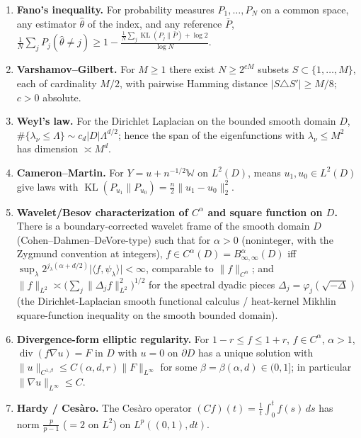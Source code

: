 \documentclass[11pt]{article}
\theoremstyle{remark}
\newcommand{\W}{\mathbb{W}}
\newcommand{\norm}[1]{\lVert #1\rVert}
\newcommand{\abs}[1]{\lvert #1\rvert}
\newcommand{\inner}[2]{\langle #1,#2\rangle}
\newcommand{\SET}[1]{\{#1\}}
\DeclareMathOperator{\diver}{div}
\begin{document}
\begin{enumerate}[label=(T\arabic*),itemsep=1pt,leftmargin=2.2em]
\item\label{T:fano}\textbf{Fano's inequality.} For probability measures
$P_1,\dots,P_N$ on a common space, any estimator $\widehat\theta$ of the
index, and any reference $\bar P$,
$\frac1N\sum_{j} P_j(\widehat\theta\ne j)\ge 1-\frac{\frac1N\sum_j
\operatorname{KL}(P_j\|\bar P)+\log 2}{\log N}$.
\item\label{T:VG}\textbf{Varshamov--Gilbert.} For $M\ge1$ there exist
$N\ge 2^{cM}$ subsets $S\subset\SET{1,\dots,M}$, each of cardinality $M/2$,
with pairwise Hamming distance $\abs{S\triangle S'}\ge M/8$; $c>0$
absolute.
\item\label{T:weyl}\textbf{Weyl's law.} For the Dirichlet Laplacian on the
bounded smooth domain $D$, $\#\SET{\lambda_\nu\le\Lambda}\sim
c_d\abs D\Lambda^{d/2}$; hence the span of the eigenfunctions with
$\lambda_\nu\le M^2$ has dimension $\asymp M^{d}$.
\item\label{T:CM}\textbf{Cameron--Martin.} For $Y=u+n^{-1/2}\W$ on
$L^2(D)$, means $u_1,u_0\in L^2(D)$ give laws with
$\operatorname{KL}(P_{u_1}\|P_{u_0})=\frac{n}{2}\norm{u_1-u_0}_2^2$.
\item\label{T:wave}\textbf{Wavelet/Besov characterization of $C^\alpha$
and square function on $D$.} There is a boundary-corrected wavelet frame of
the smooth domain $D$ (Cohen--Dahmen--DeVore-type) such that for
$\alpha>0$ (noninteger, with the Zygmund convention at integers),
$f\in C^\alpha(D)=B^\alpha_{\infty,\infty}(D)$ iff
$\sup_{\lambda}2^{j_\lambda(\alpha+d/2)}\abs{\inner{f}{\psi_\lambda}}
<\infty$, comparable to $\norm{f}_{C^\alpha}$; and
$\norm{f}_{L^2}\asymp\bigl(\sum_j\norm{\Delta_j f}_{L^2}^2\bigr)^{1/2}$ for
the spectral dyadic pieces $\Delta_j=\varphi_j(\sqrt{-\Delta})$ (the
Dirichlet-Laplacian smooth functional calculus / heat-kernel Mikhlin
square-function inequality on the smooth bounded domain).
\item\label{T:schauder}\textbf{Divergence-form elliptic regularity.} For
$1-r\le f\le1+r$, $f\in C^\alpha$, $\alpha>1$, $\diver(f\nabla u)=F$ in
$D$ with $u=0$ on $\partial D$ has a unique solution with
$\norm{u}_{C^{1,\beta}}\le C(\alpha,d,r)\norm{F}_{L^\infty}$ for some
$\beta=\beta(\alpha,d)\in(0,1]$; in particular
$\norm{\nabla u}_{L^\infty}\le C$.
\item\label{T:hardy}\textbf{Hardy / Ces\`aro.} The Ces\`aro operator
$(Cf)(t)=\frac1t\int_0^t f(s)\,ds$ has norm $\frac{p}{p-1}$ ($=2$ on $L^2$)
on $L^p((0,1),dt)$.
\end{enumerate}
\end{document}
